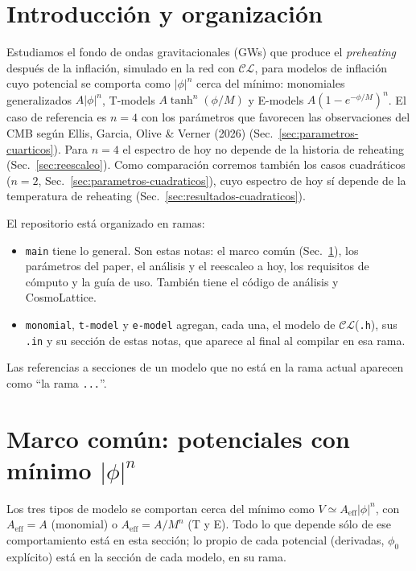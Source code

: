 \documentclass[11pt]{article}
\newcommand{\CosmoLattice}{\ensuremath{\mathcal{C}}\text{osmo}\ensuremath{\mathcal{L}}\text{attice}\xspace}
\begin{document}
    \sloppy

    \section*{Introducción y organización}

        Estudiamos el fondo de ondas gravitacionales (GWs) que produce el \emph{preheating} después de la inflación, simulado en la red con \CosmoLattice, para modelos de inflación cuyo potencial se comporta como $|\phi|^n$ cerca del mínimo: monomiales generalizados $A|\phi|^n$, T-models $A\tanh^n(\phi/M)$ y E-models $A(1-e^{-\phi/M})^n$. El caso de referencia es $n = 4$ con los parámetros que favorecen las observaciones del CMB según Ellis, Garcia, Olive \& Verner (2026) (Sec.~\ref{sec:parametros-cuarticos}). Para $n = 4$ el espectro de hoy no depende de la historia de reheating (Sec.~\ref{sec:reescaleo}). Como comparación corremos también los casos cuadráticos ($n = 2$, Sec.~\ref{sec:parametros-cuadraticos}), cuyo espectro de hoy sí depende de la temperatura de reheating (Sec.~\ref{sec:resultados-cuadraticos}).

        El repositorio está organizado en ramas:
        \begin{itemize}
            \item \texttt{main} tiene lo general. Son estas notas: el marco común (Sec.~\ref{sec:marco}), los parámetros del paper, el análisis y el reescaleo a hoy, los requisitos de cómputo y la guía de uso. También tiene el código de análisis y CosmoLattice.
            \item \texttt{monomial}, \texttt{t-model} y \texttt{e-model} agregan, cada una, el modelo de \CosmoLattice (\texttt{.h}), sus \texttt{.in} y su sección de estas notas, que aparece al final al compilar en esa rama.
        \end{itemize}
        Las referencias a secciones de un modelo que no está en la rama actual aparecen como ``la rama \texttt{...}''.

    \section{Marco común: potenciales con mínimo $|\phi|^n$}
        \label{sec:marco}

        Los tres tipos de modelo se comportan cerca del mínimo como $V \simeq A_{\text{eff}} |\phi|^n$, con $A_{\text{eff}} = A$ (monomial) o $A_{\text{eff}} = A/M^n$ (T y E). Todo lo que depende sólo de ese comportamiento está en esta sección; lo propio de cada potencial (derivadas, $\phi_0$ explícito) está en la sección de cada modelo, en su rama.
\end{document}
